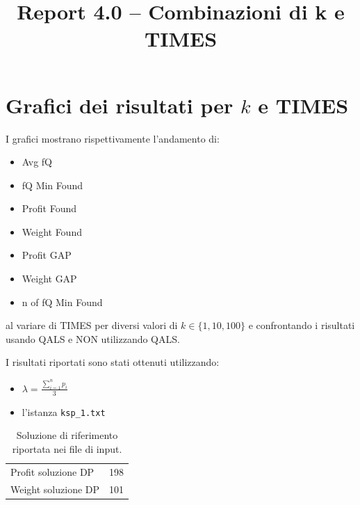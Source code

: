 \documentclass[a4paper,12pt]{article}
\title{Report 4.0 -- Combinazioni di k e TIMES}
\begin{document}
\maketitle

\newpage

\section{Grafici dei risultati per $k$ e TIMES}

I grafici mostrano rispettivamente l'andamento di:
\begin{itemize} 
    \item Avg fQ           
    \item fQ Min Found     
    \item Profit Found     
    \item Weight Found     
    \item Profit GAP       
    \item Weight GAP       
    \item n of fQ Min Found
\end{itemize}
al variare di TIMES per diversi valori di $k \in \{1,10,100\}$ e confrontando
i risultati usando QALS e NON utilizzando QALS.

I risultati riportati sono stati ottenuti utilizzando:

\begin{itemize}
    \item $\lambda = \frac{\sum_{i=1}^{n} p_i}{3}$
    \item l'istanza \texttt{ksp\_1.txt}
\end{itemize}

\begin{table}[H]
\centering
\begin{tabular}{lc}
\hline
Profit soluzione DP & 198 \\
Weight soluzione DP & 101 \\
\hline
\end{tabular}
\caption{Soluzione di riferimento riportata nei file di input.}
\label{tab:knapsack-solution}
\end{table}
\end{document}
